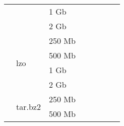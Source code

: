 \documentclass{article}           %
\begin{document}
\begin{table}[]
\begin{tabular}{llllllll}
\multicolumn{1}{|l|}{}                               & \multicolumn{1}{l|}{}                         & \multicolumn{1}{l|}{1 Gb}   & \multicolumn{1}{l|}{}       & \multicolumn{1}{l|}{}       & \multicolumn{1}{l|}{}           & \multicolumn{1}{l|}{}      & \multicolumn{1}{l|}{}        \\ \cline{3-8} 
\multicolumn{1}{|l|}{}                               & \multicolumn{1}{l|}{}                         & \multicolumn{1}{l|}{2 Gb}   & \multicolumn{1}{l|}{}       & \multicolumn{1}{l|}{}       & \multicolumn{1}{l|}{}           & \multicolumn{1}{l|}{}      & \multicolumn{1}{l|}{}        \\ \cline{2-8} 
\multicolumn{1}{|l|}{}                               & \multicolumn{1}{l|}{\multirow{4}{*}{lzo}}     & \multicolumn{1}{l|}{250 Mb} & \multicolumn{1}{l|}{}       & \multicolumn{1}{l|}{}       & \multicolumn{1}{l|}{}           & \multicolumn{1}{l|}{}      & \multicolumn{1}{l|}{}        \\ \cline{3-8} 
\multicolumn{1}{|l|}{}                               & \multicolumn{1}{l|}{}                         & \multicolumn{1}{l|}{500 Mb} & \multicolumn{1}{l|}{}       & \multicolumn{1}{l|}{}       & \multicolumn{1}{l|}{}           & \multicolumn{1}{l|}{}      & \multicolumn{1}{l|}{}        \\ \cline{3-8} 
\multicolumn{1}{|l|}{}                               & \multicolumn{1}{l|}{}                         & \multicolumn{1}{l|}{1 Gb}   & \multicolumn{1}{l|}{}       & \multicolumn{1}{l|}{}       & \multicolumn{1}{l|}{}           & \multicolumn{1}{l|}{}      & \multicolumn{1}{l|}{}        \\ \cline{3-8} 
\multicolumn{1}{|l|}{}                               & \multicolumn{1}{l|}{}                         & \multicolumn{1}{l|}{2 Gb}   & \multicolumn{1}{l|}{}       & \multicolumn{1}{l|}{}       & \multicolumn{1}{l|}{}           & \multicolumn{1}{l|}{}      & \multicolumn{1}{l|}{}        \\ \cline{2-8} 
\multicolumn{1}{|l|}{}                               & \multicolumn{1}{l|}{\multirow{4}{*}{tar.bz2}} & \multicolumn{1}{l|}{250 Mb} & \multicolumn{1}{l|}{}       & \multicolumn{1}{l|}{}       & \multicolumn{1}{l|}{}           & \multicolumn{1}{l|}{}      & \multicolumn{1}{l|}{}        \\ \cline{3-8} 
\multicolumn{1}{|l|}{}                               & \multicolumn{1}{l|}{}                         & \multicolumn{1}{l|}{500 Mb} & \multicolumn{1}{l|}{}       & \multicolumn{1}{l|}{}       & \multicolumn{1}{l|}{}           & \multicolumn{1}{l|}{}      & \multicolumn{1}{l|}{}        \\ \cline{3-8} 

\end{tabular}
\end{table}
\end{document}
